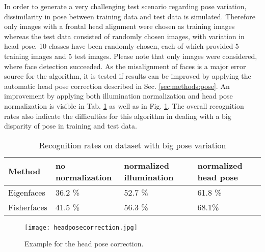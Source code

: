 In order to generate a very challenging test scenario regarding pose variation, dissimilarity in pose between training data and test data is simulated.
Therefore only images with a frontal head alignment were chosen as training images whereas the test data consisted of randomly chosen images, with variation in head pose.
10 classes have been randomly chosen, each of which provided 5 training images and 5 test images.
Please note that only images were considered, where face detection succeeded.
As the misalignment of faces is a major error source for the algorithm, it is tested if results can be improved by applying the automatic head pose correction described in Sec. \ref{sec:methods:pose}.
An improvement by applying both illumination normalization and head pose normalization is visible in Tab. \ref{tab:EvalPose} as well as in Fig. \ref{fig:headposecorrection}.
The overall recognition rates also indicate the difficulties for this algorithm in dealing with a big disparity of pose in training and test data.
\begin{table}
  \centering
  \caption{Recognition rates on dataset with big pose variation}
  \label{tab:EvalPose}
  \begin{tabular}{p{1.2cm}|p{1.2cm}|p{1.4cm}|p{1.4cm}}
    Method& no normalization &normalized illumination & normalized head pose \\
    \hline
    Eigenfaces & 36.2 \% & 52.7 \% & 61.8 \% \\
    Fisherfaces&41.5 \% & 56.3 \% & 68.1\% \\
  \end{tabular}
\end{table}
%    

\begin{figure}[t]
	\begin{center}
		\texttt{[image: headposecorrection.jpg]}
	\end{center}
	\caption{Example for the head pose correction.}
	\label{fig:headposecorrection}
\end{figure}

